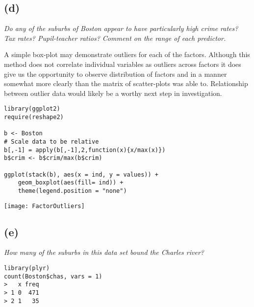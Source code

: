 \documentclass[a4paper,man,natbib]{apa6}
\begin{document}
\subsection{(d)}
\emph{Do any of the suburbs of Boston appear to have particularly
high crime rates? Tax rates? Pupil-teacher ratios? Comment on
the range of each predictor.} \vspace{2em}

A simple box-plot may demonstrate outliers for each of the factors. Although this method does not correlate individual variables as outliers across factors it does give us the opportunity to observe distribution of factors and in a manner somewhat more clearly than the matrix of scatter-plots was able to. Relationship between outlier data would likely be a worthy next step in investigation. \\

\begin{verbatim}
library(ggplot2)
require(reshape2)

b <- Boston
# Scale data to be relative
b[,-1] = apply(b[,-1],2,function(x){x/max(x)})
b$crim <- b$crim/max(b$crim)

ggplot(stack(b), aes(x = ind, y = values)) +
	geom_boxplot(aes(fill= ind)) +
	theme(legend.position = "none") 
\end{verbatim}

\begin{center}
	\texttt{[image: FactorOutliers]}
\end{center}

\subsection{(e)}
\emph{How many of the suburbs in this data set bound the Charles
river?}
\begin{verbatim}
library(plyr)
count(Boston$chas, vars = 1)
>   x freq
> 1 0  471
> 2 1   35
\end{verbatim}
\end{document}
